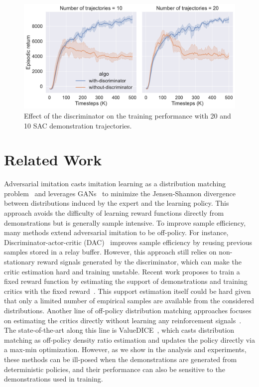 \documentclass[letterpaper]{article} %
\begin{document}
\begin{figure}
    \centering
    \includegraphics[width=0.9\linewidth]{ablation.pdf}
    \caption{Effect of the discriminator on the training performance with 20 and 10 SAC demonstration trajectories.}
    \label{fig:ablation-discriminator}
\end{figure}


\section{Related Work}
Adversarial imitation casts imitation learning as a distribution matching problem~\cite{ho2016generative} and leverages GANs~\cite{goodfellow2014generative} to minimize the Jensen-Shannon divergence between distributions induced by the expert and the learning policy. 
This approach avoids the difficulty of learning reward functions directly from demonstrations but is generally sample intensive.
To improve sample efficiency, many methods extend adversarial imitation to be off-policy. 
For instance, Discriminator-actor-critic (DAC)~\cite{kostrikov2018discriminator,sasaki2018sample} improves sample efficiency by reusing previous samples stored in a relay buffer.
However, this approach still relies on non-stationary reward signals generated by the discriminator, which can make the critic estimation hard and training unstable. 
Recent work proposes to train a fixed reward function by estimating the support of demonstrations and training  critics with the fixed reward~\cite{wang2019random}.
This support estimation itself could be hard given that only a limited number of empirical samples are available from the considered distributions. 
Another line of off-policy distribution matching approaches focuses on estimating the critics directly without learning any reinforcement signals~\cite{sasaki2018sample,kostrikov2019imitation}.
The state-of-the-art along this line is  ValueDICE~\cite{kostrikov2019imitation}, which casts distribution matching as off-policy density ratio estimation and updates the policy directly via a max-min optimization. 
However, as we show in the analysis and experiments, these methods can be ill-posed when the demonstrations are generated from deterministic policies, and their performance can also be sensitive to the demonstrations used in training.
\end{document}
